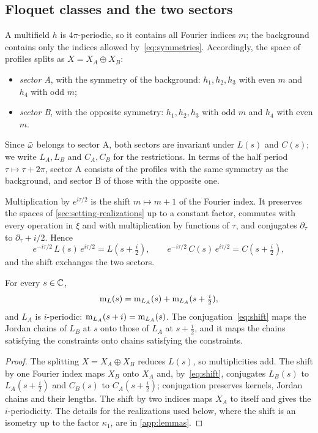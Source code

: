 \subsection{Floquet classes and the two sectors}\label{sec:setting-sectors}

A multifield $h$ is $4\pi$-periodic, so it contains all Fourier indices $m$; the background contains
only the indices allowed by~\eqref{eq:symmetries}. Accordingly, the space of profiles splits as
$X=X_A\oplus X_B$:
\begin{itemize}[leftmargin=*]
\item \emph{sector A}, with the symmetry of the background: $h_1,h_2,h_3$ with even $m$ and $h_4$ with
  odd $m$;
\item \emph{sector B}, with the opposite symmetry: $h_1,h_2,h_3$ with odd $m$ and $h_4$ with even $m$.
\end{itemize}
Since $\bar\omega$ belongs to sector A, both sectors are invariant under $L(s)$ and $C(s)$; we write
$L_A,L_B$ and $C_A,C_B$ for the restrictions. In terms of the half period $\tau\mapsto\tau+2\pi$, sector A
consists of the profiles with the same symmetry as the background, and sector B of those with the opposite
one.

Multiplication by $e^{i\tau/2}$ is the shift $m\mapsto m+1$ of the Fourier index. It preserves the
spaces of \cref{sec:setting-realizations} up to a constant factor, commutes with every operation
in $\xi$ and with multiplication by functions of $\tau$, and conjugates $\partial_\tau$ to
$\partial_\tau+i/2$. Hence
\begin{equation}\label{eq:shift}
  e^{-i\tau/2}\,L(s)\,e^{i\tau/2}=L(s+\tfrac{i}{2}),\qquad
  e^{-i\tau/2}\,C(s)\,e^{i\tau/2}=C(s+\tfrac{i}{2}),
\end{equation}
and the shift exchanges the two sectors.

\begin{lemma}\label{lem:sectorB}
For every $s\in\mathbb{C}$,
\[
  \operatorname{m}_L(s)=\operatorname{m}_{L_A}(s)+\operatorname{m}_{L_A}(s+\tfrac{i}{2}),
\]
and $L_A$ is $i$-periodic: $\operatorname{m}_{L_A}(s+i)=\operatorname{m}_{L_A}(s)$. The conjugation~\eqref{eq:shift} maps the
Jordan chains of $L_B$ at $s$ onto those of $L_A$ at $s+\tfrac i2$, and it maps the chains satisfying the
constraints onto chains satisfying the constraints.
\end{lemma}

\begin{proof}
The splitting $X=X_A\oplus X_B$ reduces $L(s)$, so multiplicities add. The shift by one Fourier index
maps $X_B$ onto $X_A$ and, by~\eqref{eq:shift}, conjugates $L_B(s)$ to $L_A(s+\tfrac i2)$ and $C_B(s)$
to $C_A(s+\tfrac i2)$; conjugation preserves kernels, Jordan chains and their lengths. The shift by two
indices maps $X_A$ to itself and gives the $i$-periodicity. The details for the realizations used below,
where the shift is an isometry up to the factor $\kappa_1$, are in \cref{app:lemmas}.
\end{proof}

